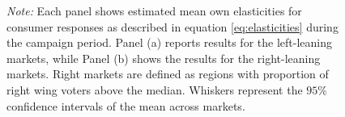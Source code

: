 \documentclass[12pt]{article}
\begin{document}
\begin{figure}[!htbp]
		\vspace{0.5em} %
		
		\captionsetup{justification=justified}
		\caption*{\textit{Note:} \small Each panel shows estimated mean own elasticities for consumer responses  as described in equation \ref{eq:elasticities} during the campaign period. Panel (a) reports results for the left-leaning markets, while Panel (b) shows the results for the right-leaning markets. Right markets are defined as regions with proportion of right wing voters above the median. Whiskers represent the $95\%$ confidence intervals of the mean across markets.}
						
	\end{figure}
	

	
\end{document}
